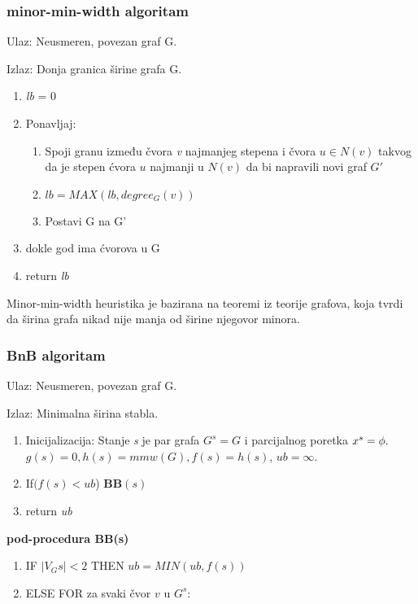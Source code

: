 \documentclass[10pt]{article}
\begin{document}
\subsubsection{minor-min-width algoritam}

Ulaz: Neusmeren, povezan graf G.

Izlaz: Donja granica širine grafa G.

\begin{enumerate}
    \item \textit{lb} = 0
    \item Ponavljaj:
    \begin{enumerate}
    \item Spoji granu između čvora \textit{v} najmanjeg stepena i čvora $u\in N(v)$ takvog da je stepen ćvora $u$ najmanji u $N(v)$ da bi napravili novi graf $G'$
    \item $lb = MAX(lb, degree_G(v))$
    \item Postavi G na G'
    \end{enumerate}
    \item dokle god ima ćvorova u G
    \item return \textit{lb}
\end{enumerate}

Minor-min-width heuristika je bazirana na teoremi iz teorije grafova, koja tvrdi da širina grafa nikad nije manja od širine njegovor minora.
\subsubsection{BnB algoritam}

Ulaz: Neusmeren, povezan graf G.

Izlaz: Minimalna širina stabla.

\begin{enumerate}
    \item Inicijalizacija: Stanje \textit{s} je par grafa $G^s = G$ i parcijalnog poretka $x^s = \phi.\\$$g(s) = 0, h(s) = mmw(G), f(s) = h(s)$, $ub = \infty$.
    \item If$(f(s) < ub$) \textbf{BB}$(s)$
    \item return \textit{ub}
\end{enumerate}

\textbf{pod-procedura BB(s)}
\begin{enumerate}
    \item IF $|V_Gs|<2$ THEN $ub = MIN(ub, f(s))$
    \item ELSE FOR za svaki čvor $v$ u $G^s$:
    \begin{enumerate}
    \item Napravi stanje $s' = ({G^s^'}, {x^s^'})$ gde je\\ ${G^s^'} = elim({G^s}, v)$ i  ${x^s^'} = (x^s, v).$
    \item $g({s^'}) = MAX(g(s), degree_{G^s}(v))$
    \item $h({s^'}) =$ \textbf{minor-min-width}($G^s^'})$
    \item $f({s^'}) = MAX(g({s^'}), h({s^'}))$
    \item If $f({s^'}) < ub$ onda $BB({s^'})$
    \end{enumerate}
\end{enumerate}
\end{document}
